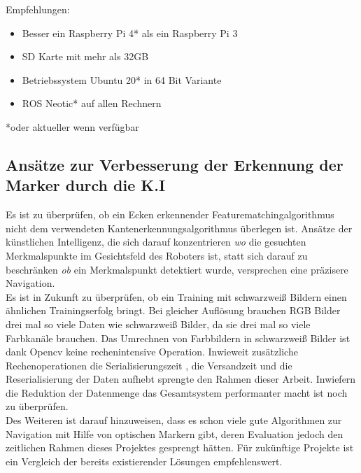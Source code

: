 \documentclass[conference]{IEEEtran}
\begin{document}
	Empfehlungen:
	\begin{itemize}
		\item  Besser ein Raspberry Pi 4* als ein Raspberry Pi 3
		\item  SD Karte mit mehr als 32GB
		\item Betriebssystem Ubuntu 20* in 64 Bit Variante
		\item  ROS Neotic* auf allen Rechnern
	\end{itemize}
	*oder aktueller wenn verfügbar
	\subsection{Ansätze zur Verbesserung der Erkennung der Marker durch die K.I}
	
	Es ist zu überprüfen, ob ein Ecken erkennender Featurematchingalgorithmus nicht dem verwendeten Kantenerkennungsalgorithmus überlegen ist. Ansätze der künstlichen Intelligenz, die sich darauf konzentrieren \textit{wo} die gesuchten Merkmalspunkte  im Gesichtsfeld des Roboters ist, statt sich darauf zu beschränken \textit{ob} ein Merkmalspunkt detektiert wurde, versprechen eine präzisere Navigation. \\
	Es ist in Zukunft zu überprüfen, ob ein Training mit schwarzweiß Bildern einen ähnlichen Trainingserfolg bringt. Bei gleicher Auflösung brauchen RGB Bilder drei mal so viele Daten wie schwarzweiß Bilder, da sie drei mal so viele Farbkanäle brauchen. Das Umrechnen von Farbbildern in schwarzweiß Bilder ist dank Opencv keine rechenintensive Operation. Inwieweit zusätzliche Rechenoperationen die Serialisierungszeit , die Versandzeit und die Reserialisierung der Daten aufhebt sprengte den Rahmen dieser Arbeit. Inwiefern die Reduktion der Datenmenge das Gesamtsystem performanter macht ist noch zu überprüfen.
	\\
	Des Weiteren ist darauf hinzuweisen, dass es schon viele gute Algorithmen zur Navigation mit Hilfe von optischen Markern gibt, deren Evaluation jedoch den zeitlichen Rahmen dieses Projektes gesprengt hätten. Für zukünftige Projekte ist ein Vergleich der bereits existierender Lösungen empfehlenswert.
	
	
\end{document}
